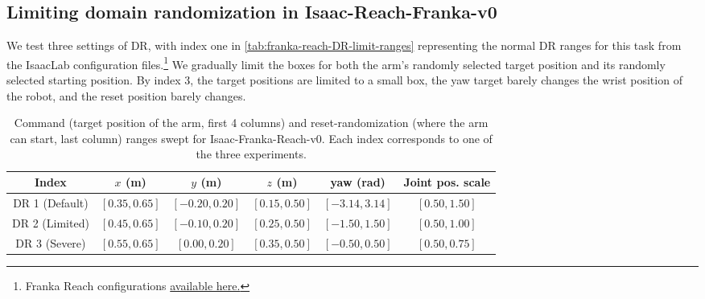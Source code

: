 \documentclass{article} %
\begin{document}
    \subsection{Limiting domain randomization in Isaac-Reach-Franka-v0}

        We test three settings of DR, with index one in \autoref{tab:franka-reach-DR-limit-ranges} representing the normal DR ranges for this task from the IsaacLab configuration files.\footnote{Franka Reach configurations \href{https://github.com/isaac-sim/IsaacLab/blob/main/source/isaaclab_tasks/isaaclab_tasks/manager_based/manipulation/reach/reach_env_cfg.py\#L70}{available here.}} We gradually limit the boxes for both the arm's randomly selected target position and its randomly selected starting position. By index 3, the target positions are limited to a small box, the yaw target barely changes the wrist position of the robot, and the reset position barely changes.

        \begin{table}[h]
            \centering
            \caption{Command (target position of the arm, first 4 columns) and reset-randomization (where the arm can start, last column) ranges swept for Isaac-Franka-Reach-v0. Each index corresponds to one of the three experiments.}
            \label{tab:franka-reach-DR-limit-ranges}
            \begin{tabular}{c cccc c}
            \toprule
            Index & $x$ (m) & $y$ (m) & $z$ (m) & yaw (rad) & Joint pos. scale \\
            \midrule
            DR 1 (Default) & $[0.35, 0.65]$ & $[-0.20, 0.20]$ & $[0.15, 0.50]$ & $[-3.14, 3.14]$ & $[0.50, 1.50]$ \\
            DR 2 (Limited) & $[0.45, 0.65]$ & $[-0.10, 0.20]$ & $[0.25, 0.50]$ & $[-1.50, 1.50]$ & $[0.50, 1.00]$ \\
            DR 3 (Severe) & $[0.55, 0.65]$ & $[0.00, 0.20]$  & $[0.35, 0.50]$ & $[-0.50, 0.50]$ & $[0.50, 0.75]$ \\
            \bottomrule
            \end{tabular}
        \end{table}

\end{document}
